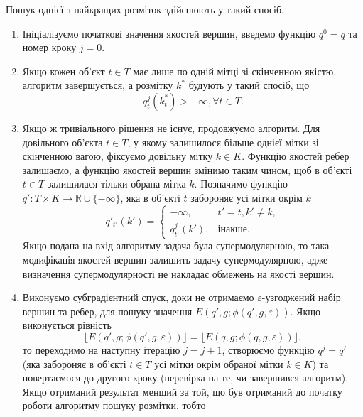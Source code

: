 Пошук однієї з найкращих розміток здійснюють у такий спосіб.
\begin{enumerate}
    \item Ініціалізуємо початкові значення якостей вершин, введемо функцію $q^0=q$ та номер кроку $j=0$.
    \item Якщо кожен об'єкт $t\in T$ має лише по одній мітці зі скінченною якістю, алгоритм завершується, 
    а розмітку $k^*$ будують у такий спосіб, що
    \begin{equation*}
        q^j_t(k^*_t)>-\infty, \forall t\in T.
    \end{equation*}
    \item Якщо ж тривіального рішення не існує, продовжуємо алгоритм. Для довільного
    об'єкта $t\in T$, у якому залишилося більше однієї мітки зі скінченною вагою, фіксуємо довільну мітку $k\in K$.
    Функцію якостей ребер залишаємо, а функцію якостей вершин змінимо таким чином, щоб в об'єкті $t\in T$ залишилася тільки 
    обрана мітка $k$. Позначимо функцію $q':T\times K\rightarrow\mathbb{R}\cup\{-\infty\}$, 
    яка в об'єкті $t$ забороняє усі мітки окрім $k$
    \begin{equation*}
        q'_{t'}(k') =
        \begin{cases}
            -\infty, & t'=t, k' \neq k,\\
            q^j_{t'}(k'), & \text{інакше.}
        \end{cases}
    \end{equation*}
    Якщо подана на вхід алгоритму задача була супермодулярною, то така модифікація якостей вершин
    залишить задачу супермодулярною, адже визначення супермодулярності не накладає обмежень на якості вершин.
    \item Виконуємо субградієнтний спуск, доки не отримаємо $\varepsilon$-узгоджений 
    набір вершин та ребер, для пошуку значення $E(q',g;\phi(q',g,\varepsilon))$. Якщо виконується рівність
    \begin{equation*}
        \lfloor E(q',g;\phi(q',g,\varepsilon))\rfloor = \lfloor E(q,g;\phi(q,g,\varepsilon))\rfloor, 
    \end{equation*}
    то переходимо на наступну ітерацію $j=j+1$, створюємо функцію $q^j=q'$ (яка 
    забороняє в об'єкті $t\in T$ усі мітки окрім обраної мітки $k\in K$) та повертаємося до другого кроку
    (перевірка на те, чи завершився алгоритм). Якщо отриманий результат менший за той, що був отриманий до початку 
    роботи алгоритму пошуку розмітки, тобто
    \begin{equation*}

\end{equation*}
\end{enumerate}
